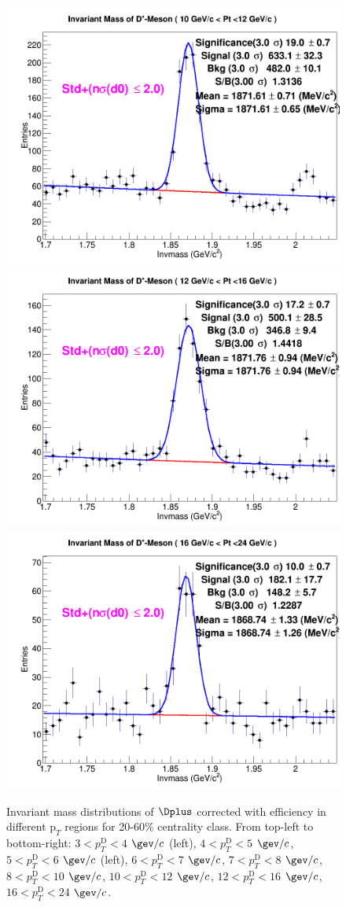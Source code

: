 \begin{figure}[!htp]
{\includegraphics[width=0.3\linewidth]{Centrality_DPlus/Dplus/Cmp_Prompt/ZNA/20_60/DplusMassPlots/1Dhist_DplusMass_12OCT16_pT_bin9.png}}
{\includegraphics[width=0.3\linewidth]{Centrality_DPlus/Dplus/Cmp_Prompt/ZNA/20_60/DplusMassPlots/1Dhist_DplusMass_12OCT16_pT_bin10.png}}
{\includegraphics[width=0.3\linewidth]{Centrality_DPlus/Dplus/Cmp_Prompt/ZNA/20_60/DplusMassPlots/1Dhist_DplusMass_12OCT16_pT_bin11.png}}

\caption{Invariant mass distributions of $\Dplus$ corrected with efficiency in different $\text{p}_T$ regions for 20-60$\%$ centrality class. From top-left to bottom-right: $3< p_{T}^{\text{D}}< 4$ $\gev/c$ (left), $4< p_{T}^{\text{D}}< 5$ $\gev/c$, $5< p_{T}^{\text{D}}< 6$ $\gev/c$ (left), $6 < p_{T}^{\text{D}} < 7$ $\gev/c$, $7< p_{T}^{\text{D}}< 8$ $\gev/c$, $8< p_{T}^{\text{D}}< 10$ $\gev/c$, $10< p_{T}^{\text{D}}< 12$ $\gev/c$, $12 < p_{T}^{\text{D}}< 16$ $\gev/c$, $16<p_{T}^{\text{D}}< 24$ $\gev/c$.}
\label{fig:InvMassDplus2060}
\end{figure}

